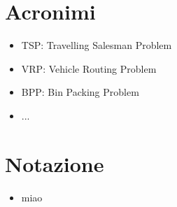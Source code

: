 \appendix
\chapter{Acronimi}
\begin{itemize}
\item TSP: Travelling Salesman Problem 
\item VRP: Vehicle Routing Problem 
\item BPP: Bin Packing Problem
\item ...
\end{itemize}





\chapter{Notazione}
\begin{itemize}
	\item miao
\end{itemize}











